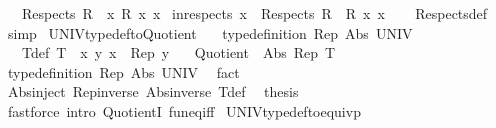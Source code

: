 \begin{isabellebody}
\ \ \ {\isachardoublequoteopen}Respects\ R\ {\isacharequal}{\kern0pt}\ {\isacharbraceleft}{\kern0pt}x{\isachardot}{\kern0pt}\ R\ x\ x{\isacharbraceright}{\kern0pt}{\isachardoublequoteclose}\isanewline
\isanewline
{}\isamarkupfalse%
\ in{\isacharunderscore}{\kern0pt}respects{\isacharcolon}{\kern0pt}\ {\isachardoublequoteopen}x\ {\isasymin}\ Respects\ R\ {\isasymlongleftrightarrow}\ R\ x\ x{\isachardoublequoteclose}\isanewline
%
\isadelimproof
\ \ %
\endisadelimproof
%
\isatagproof
{}\isamarkupfalse%
\ Respects{\isacharunderscore}{\kern0pt}def\ \isamarkupfalse%
\ simp%
\endisatagproof
{\isafoldproof}%
%
\isadelimproof
\isanewline
%
\endisadelimproof
\isanewline
{}\isamarkupfalse%
\ UNIV{\isacharunderscore}{\kern0pt}typedef{\isacharunderscore}{\kern0pt}to{\isacharunderscore}{\kern0pt}Quotient{\isacharcolon}{\kern0pt}\isanewline
\ \ \ {\isachardoublequoteopen}type{\isacharunderscore}{\kern0pt}definition\ Rep\ Abs\ UNIV{\isachardoublequoteclose}\isanewline
\ \ \ T{\isacharunderscore}{\kern0pt}def{\isacharcolon}{\kern0pt}\ {\isachardoublequoteopen}T\ {\isasymequiv}\ {\isacharparenleft}{\kern0pt}{\isasymlambda}x\ y{\isachardot}{\kern0pt}\ x\ {\isacharequal}{\kern0pt}\ Rep\ y{\isacharparenright}{\kern0pt}{\isachardoublequoteclose}\isanewline
\ \ \ {\isachardoublequoteopen}Quotient\ {\isacharparenleft}{\kern0pt}{\isacharequal}{\kern0pt}{\isacharparenright}{\kern0pt}\ Abs\ Rep\ T{\isachardoublequoteclose}\isanewline
%
\isadelimproof
%
\endisadelimproof
%
\isatagproof
{}\isamarkupfalse%
\ {\isacharminus}{\kern0pt}\isanewline
\ \ \isamarkupfalse%
\ type{\isacharunderscore}{\kern0pt}definition\ Rep\ Abs\ UNIV\ \isamarkupfalse%
\ fact\isanewline
\ \ \isamarkupfalse%
\ Abs{\isacharunderscore}{\kern0pt}inject\ Rep{\isacharunderscore}{\kern0pt}inverse\ Abs{\isacharunderscore}{\kern0pt}inverse\ T{\isacharunderscore}{\kern0pt}def\ \isamarkupfalse%
\ {\isacharquery}{\kern0pt}thesis\isanewline
\ \ \ \ \isamarkupfalse%
\ {\isacharparenleft}{\kern0pt}fastforce\ intro{\isacharbang}{\kern0pt}{\isacharcolon}{\kern0pt}\ QuotientI\ fun{\isacharunderscore}{\kern0pt}eq{\isacharunderscore}{\kern0pt}iff{\isacharparenright}{\kern0pt}\isanewline
{}\isamarkupfalse%
%
\endisatagproof
{\isafoldproof}%
%
\isadelimproof
\isanewline
%
\endisadelimproof
\isanewline
{}\isamarkupfalse%
\ UNIV{\isacharunderscore}{\kern0pt}typedef{\isacharunderscore}{\kern0pt}to{\isacharunderscore}{\kern0pt}equivp{\isacharcolon}{\kern0pt}\isanewline

\end{isabellebody}
